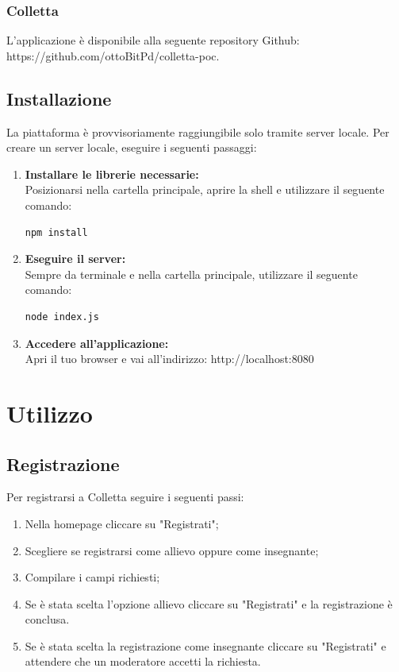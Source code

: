 \documentclass[11pt,a4paper]{article}
\begin{document}
{	\subsubsection{Colletta}		
	L'applicazione è disponibile alla seguente repository Github:
	https://github.com/ottoBitPd/colletta-poc.
	
	\subsection{Installazione}
	La piattaforma è provvisoriamente raggiungibile solo tramite server locale.
	Per creare un server locale, eseguire i seguenti passaggi:
	 \begin{enumerate}
	 	\item \textbf{Installare le librerie necessarie:}\\ Posizionarsi nella cartella principale, aprire la shell e utilizzare il seguente comando:\begin{lstlisting}[numbers=none]
	 	npm install
	 	\end{lstlisting}
	 	\item \textbf{Eseguire il server:}\\ Sempre da terminale e nella cartella principale, utilizzare il seguente comando:\begin{lstlisting}[numbers=none]
	 	node index.js
	 	\end{lstlisting}
	 	\item \textbf{Accedere all'applicazione:}\\ Apri il tuo browser e vai all'indirizzo: http://localhost:8080
	 \end{enumerate}
 
 \newpage
	\section{Utilizzo}	
	
	\subsection{Registrazione}
	Per registrarsi a Colletta seguire i seguenti passi:
	\begin{enumerate}
	\item Nella homepage cliccare su "Registrati";
	\item Scegliere se registrarsi come allievo oppure come insegnante;
	\item Compilare i campi richiesti;
	\item Se è stata scelta l'opzione allievo cliccare su "Registrati" e la registrazione è conclusa.
	\item Se è stata scelta la registrazione come insegnante cliccare su "Registrati" e attendere che un moderatore accetti la richiesta.
	\end{enumerate}

}
\end{document}
